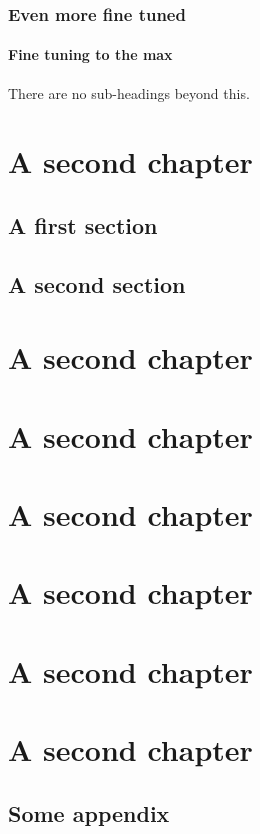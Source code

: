 \documentclass[12pt]{memoir}
\begin{document}
\subsection{Even more fine tuned}

\subsubsection{Fine tuning to the max}

There are no sub-headings beyond this.

\lipsum[1-10]

\chapter{A second chapter}

\lipsum[1-2]

\section{A first section}

\lipsum{}

\section{A second section}

\lipsum{}

\chapter{A second chapter}
\chapter{A second chapter}
\chapter{A second chapter}
\chapter{A second chapter}
\chapter{A second chapter}
\chapter{A second chapter}

\begin{appendices}
  \chapter{Some appendix}

\end{appendices}

\backmatter{}

\nocite{*} %

\end{document}
